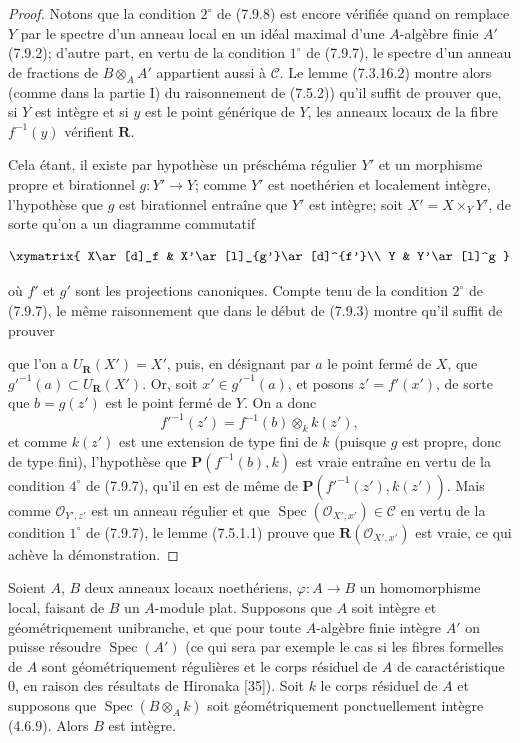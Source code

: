 \begin{proof}
Notons que la condition $2^\circ$ de (7.9.8) est encore vérifiée quand on
remplace $Y$ par le spectre d'un anneau local en un idéal maximal d'une
$A$-algèbre finie $A'$ (7.9.2); d'autre part, en vertu de la condition
$1^\circ$ de (7.9.7), le spectre d'un anneau de fractions de
$B\otimes_AA'$ appartient aussi à $\mathcal C$. Le lemme (7.3.16.2) montre
alors (comme dans la partie I) du raisonnement de (7.5.2)) qu'il suffit de
prouver que, si $Y$ est intègre et si $y$ est le point générique de $Y$, les
anneaux locaux de la fibre $f^{-1}(y)$ vérifient $\boldsymbol R$.

Cela étant, il existe par hypothèse un préschéma régulier $Y'$ et un morphisme
propre et birationnel $g:Y'\to Y$; comme $Y'$ est noethérien et localement
intègre, l'hypothèse que $g$ est birationnel entraîne que $Y'$ est intègre;
soit $X'=X\times_YY'$, de sorte qu'on a un diagramme commutatif

\begin{env}[7.9.8.1]
\label{IV.2.s7.9.8.1-fr}
\[
\xymatrix{
X\ar[d]_f & X'\ar[l]_{g'}\ar[d]^{f'}\\
Y & Y'\ar[l]^g
}
\]
\end{env}

où $f'$ et $g'$ sont les projections canoniques. Compte tenu de la condition
$2^\circ$ de (7.9.7), le même raisonnement que dans le début de (7.9.3) montre
qu'il suffit de prouver


que l'on a $U_{\boldsymbol R}(X')=X'$, puis, en désignant par $a$ le point
fermé de $X$, que $g'^{-1}(a)\subset U_{\boldsymbol R}(X')$. Or, soit
$x'\in g'^{-1}(a)$, et posons $z'=f'(x')$, de sorte que $b=g(z')$ est le
point fermé de $Y$. On a donc
\[
f'^{-1}(z')=f^{-1}(b)\otimes_k k(z'),
\]
et comme $k(z')$ est une extension de type fini de $k$ (puisque $g$ est
propre, donc de type fini), l'hypothèse que $\boldsymbol P(f^{-1}(b),k)$ est
vraie entraîne en vertu de la condition $4^\circ$ de (7.9.7), qu'il en est de
même de $\boldsymbol P(f'^{-1}(z'),k(z'))$. Mais comme
$\mathcal O_{Y',z'}$ est un anneau régulier et que
$\operatorname{Spec}(\mathcal O_{X',x'})\in\mathcal C$ en vertu de la
condition $1^\circ$ de (7.9.7), le lemme (7.5.1.1) prouve que
$\boldsymbol R(\mathcal O_{X',x'})$ est vraie, ce qui achève la démonstration.
\end{proof}

\begin{corollary}[7.9.9]
\label{IV.2.s7.9.9-fr}
Soient $A$, $B$ deux anneaux locaux noethériens, $\varphi:A\to B$ un
homomorphisme local, faisant de $B$ un $A$-module plat. Supposons que $A$ soit
intègre et géométriquement unibranche, et que pour toute $A$-algèbre finie
intègre $A'$ on puisse résoudre $\operatorname{Spec}(A')$ (ce qui sera par
exemple le cas si les fibres formelles de $A$ sont géométriquement régulières
et le corps résiduel de $A$ de caractéristique $0$, en raison des résultats de
Hironaka [35]). Soit $k$ le corps résiduel de $A$ et supposons que
$\operatorname{Spec}(B\otimes_Ak)$ soit géométriquement ponctuellement intègre
(4.6.9). Alors $B$ est intègre.
\end{corollary}

